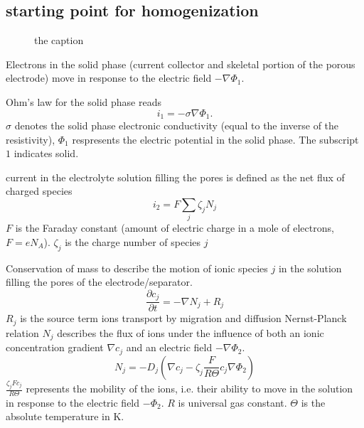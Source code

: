 \documentclass[10pt, oneside]{article}   	%
\begin{document}
\subsection{starting point for homogenization}
\begin{figure}
    \centering
{}
    \caption{the caption}
\end{figure}


Electrons in the solid phase (current collector and skeletal portion of the
porous electrode) move in response to the electric field $-\nabla \Phi_1$.

Ohm's law for the solid phase reads
\begin{equation}
    i_1 = -\sigma \nabla \Phi_1 .
    \label{eq:ohms_law_solid_phase}
\end{equation}
$\sigma$ denotes the solid phase electronic conductivity (equal to the
inverse of the resistivity), $\Phi_1$ respresents the electric potential in
the solid phase.  The subscript $1$ indicates solid.

current in the electrolyte solution filling the pores is defined as the net flux of
charged species
\begin{equation}
    i_2 = F \sum_j \zeta_j N_j
\end{equation}
$F$ is the Faraday constant (amount of electric charge in a mole of electrons,
$F=e N_A$).  $\zeta_j$ is the charge number of species $j$

Conservation of mass to describe the motion of ionic species $j$ in the
solution filling the pores of the electrode/separator.
\begin{equation}
    \frac{\partial c_j}{\partial t} =
        -\nabla N_j + R_j
    \label{eq:nernst_planck}
\end{equation}
$R_j$ is the source term 
ions transport by migration and diffusion
Nernst-Planck relation
$N_j$ describes the flux of ions under the influence of both an ionic
concentration gradient $\nabla c_j$ and an electric field $-\nabla \Phi_2$.
\begin{equation}
N_j = -D_j (\nabla c_j - \zeta_j \frac{F}{R\Theta} c_j \nabla \Phi_2)
\end{equation}
$\frac{\zeta_j F c_j}{R \Theta}$ represents the mobility of the ions, i.e.
their ability to move in the solution in response to the electric field
$-\Phi_2$.  $R$ is universal gas constant.
$\Theta$ is the absolute temperature in K.
\end{document}
